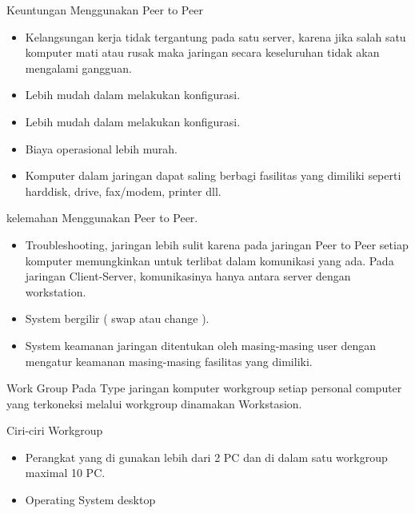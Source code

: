 Keuntungan Menggunakan Peer to Peer
\begin{itemize}
\item Kelangsungan kerja tidak tergantung pada satu server,
      karena jika salah satu komputer mati atau rusak maka jaringan secara keseluruhan tidak akan mengalami gangguan.
\item Lebih mudah dalam melakukan konfigurasi.

\item Lebih mudah dalam melakukan konfigurasi.

\item Biaya operasional lebih murah.

\item Komputer dalam jaringan dapat saling berbagi fasilitas yang dimiliki seperti harddisk, drive, fax/modem, printer dll.

\end{itemize}

kelemahan Menggunakan Peer to Peer.
\begin{itemize}
\item Troubleshooting, jaringan lebih sulit karena pada jaringan Peer to Peer setiap komputer memungkinkan untuk terlibat dalam komunikasi yang ada. Pada jaringan Client-Server, komunikasinya hanya antara server dengan workstation.

\item System bergilir ( swap atau change ).

\item System keamanan jaringan ditentukan oleh masing-masing user dengan mengatur keamanan masing-masing fasilitas yang dimiliki.

\end{itemize}

Work Group
     Pada Type jaringan komputer workgroup setiap personal computer yang terkoneksi melalui workgroup dinamakan Workstasion.

  Ciri-ciri Workgroup
\begin{itemize}
\item Perangkat yang di gunakan lebih dari 2 PC dan di dalam satu workgroup maximal 10 PC.

\item Operating System desktop

\end{itemize}

